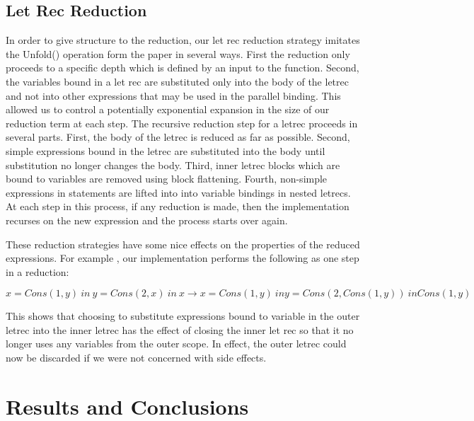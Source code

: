 \documentclass[preprint, 10pt]{sigplanconf}
\begin{document}
\subsection{Let Rec Reduction}
In order to give structure to the reduction, our let rec reduction strategy imitates the Unfold() operation form the paper in several ways.  First the reduction only proceeds to a specific depth which is defined by an input to the function.  Second, the variables bound in a let rec are substituted only into the body of the letrec and not into other expressions that may be used in the parallel binding.  This allowed us to control a potentially exponential expansion in the size of our reduction term at each step.  The recursive reduction step for a letrec proceeds in several parts.  First, the body of the letrec is reduced as far as possible.  Second, simple expressions bound in the letrec are substituted into the body until substitution no longer changes the body. Third, inner letrec blocks which are bound to variables are removed using block flattening.  Fourth, non-simple expressions in statements are lifted into into variable bindings in nested letrecs. At each step in this process, if any reduction is made, then the implementation recurses on the new expression and the process starts over again.

These reduction strategies have some nice effects on the properties of the reduced expressions.  For example , our implementation performs the following as one step in a reduction:
\begin{center}
${x=Cons(1,y)\ in\ {y=Cons(2,x)\ in\ x}} \rightarrow 
{x=Cons(1,y)\ in {y=Cons(2,Cons(1,y))\ in Cons(1,y)}}$
\end{center}

This shows that choosing to substitute expressions bound to variable in the outer letrec into the inner letrec has the effect of closing the inner let rec so that it no longer uses any variables from the outer scope.  In effect, the outer letrec could now be discarded if we were not concerned with side effects.

\section{Results and Conclusions}





\end{document}
